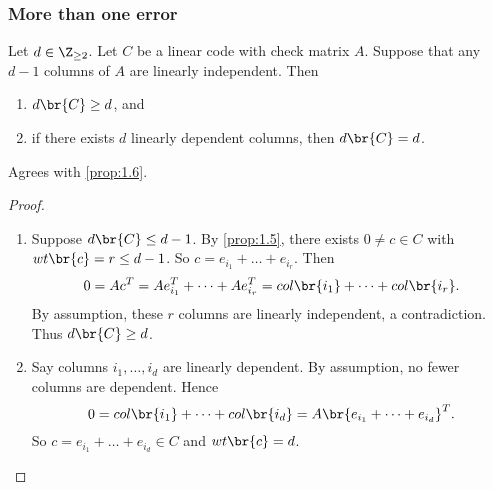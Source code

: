 \subsubsection{More than one error}

\begin{proposition}
\label{prop:1.8}
Let $ d \in \Z_{\ge 2} $. Let $ C $ be a linear code with check matrix $ A $. Suppose that any $ d - 1 $ columns of $ A $ are linearly independent. Then
\begin{enumerate}
\item $ d\br{C} \ge d $, and
\item if there exists $ d $ linearly dependent columns, then $ d\br{C} = d $.
\end{enumerate}
\end{proposition}

\begin{note*}
Agrees with \ref{prop:1.6}.
\end{note*}

\begin{proof}
\hfill
\begin{enumerate}
\item Suppose $ d\br{C} \le d - 1 $. By \ref{prop:1.5}, there exists $ 0 \ne c \in C $ with $ wt\br{c} = r \le d - 1 $. So $ c = e_{i_1} + \dots + e_{i_r} $. Then
$$ 0 = Ac^T = Ae_{i_1}^T + \dots + Ae_{i_r}^T = col\br{i_1} + \dots + col\br{i_r}. $$
By assumption, these $ r $ columns are linearly independent, a contradiction. Thus $ d\br{C} \ge d $.
\item Say columns $ i_1, \dots, i_d $ are linearly dependent. By assumption, no fewer columns are dependent. Hence
$$ 0 = col\br{i_1} + \dots + col\br{i_d} = A\br{e_{i_1} + \dots + e_{i_d}}^T. $$
So $ c = e_{i_1} + \dots + e_{i_d} \in C $ and $ wt\br{c} = d $.
\end{enumerate}
\end{proof}

